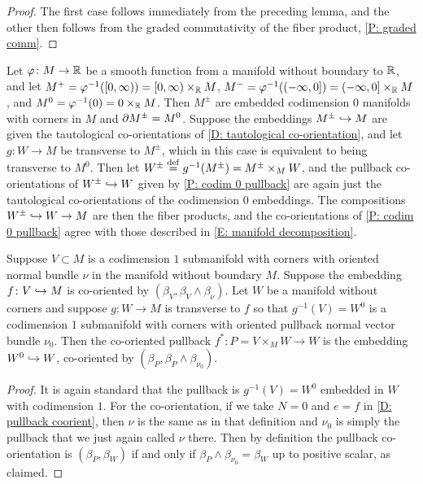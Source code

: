 \begin{proof}
	The first case follows immediately from the preceding lemma, and the other then follows from the graded commutativity of the fiber product, \cref{P: graded comm}.
\end{proof}

\begin{example}\label{E: codim 0 and 1 co-or as fiber products}
	Let $\varphi \colon M \to \mathbb{R}$ be a smooth function from a manifold without boundary to $\mathbb{R}$, and let $M^+ = \varphi^{-1}([0,\infty)) = [0,\infty) \times_{\mathbb{R}} M$, $M^- = \varphi^{-1}((-\infty,0]) = (-\infty,0] \times_{\mathbb{R}} M$, and $M^0 = \varphi^{-1}(0) = 0 \times_{\mathbb{R}} M$.
	Then $M^\pm$ are embedded codimension $0$ manifolds with corners in $M$ and $\partial M^\pm = M^0$.
	Suppose the embeddings $M^\pm \hookrightarrow M$ are given the tautological co-orientations of \cref{D: tautological co-orientation}, and let $g \colon W \to M$ be transverse to $M^\pm$, which in this case is equivalent to being transverse to $M^0$.
	Then let $W^\pm \stackrel{\mathrm{def}}{=} g^{-1}(M^\pm) = M^\pm \times_M W$, and the pullback co-orientations of $W^\pm \hookrightarrow W$ given by \cref{P: codim 0 pullback} are again just the tautological co-orientations of the codimension $0$ embeddings.
	The compositions $W^\pm \hookrightarrow W \to M$ are then the fiber products, and the co-orientations of \cref{P: codim 0 pullback} agree with those described in \cref{E: manifold decomposition}.
\end{example}

\begin{proposition}\label{P: codim 1 co-orient}
	Suppose $V \subset M$ is a codimension $1$ submanifold with corners with oriented normal bundle $\nu$ in the manifold without boundary $M$.
	Suppose the embedding $f \colon V \hookrightarrow M$ is co-oriented by $(\beta_V, \beta_V \wedge \beta_\nu)$.
	Let $W$ be a manifold without corners and suppose $g \colon W \to M$ is transverse to $f$ so that $g^{-1}(V) = W^0$ is a codimension $1$ submanifold with corners with oriented pullback normal vector bundle $\nu_0$.
	Then the co-oriented pullback $f^* \colon P = V \times_M W \to W$ is the embedding $W^0 \hookrightarrow W$, co-oriented by $(\beta_P, \beta_P \wedge \beta_{\nu_0})$.
\end{proposition}

\begin{proof}
	It is again standard that the pullback is $g^{-1}(V) = W^0$ embedded in $W$ with codimension $1$.
	For the co-orientation, if we take $N = 0$ and $e = f$ in \cref{D: pullback coorient}, then $\nu$ is the same as in that definition and $\nu_0$ is simply the pullback that we just again called $\nu$ there.
	Then by definition the pullback co-orientation is $(\beta_P, \beta_W)$ if and only if $\beta_P \wedge \beta_{\nu_0} = \beta_W$ up to positive scalar, as claimed.
\end{proof}

